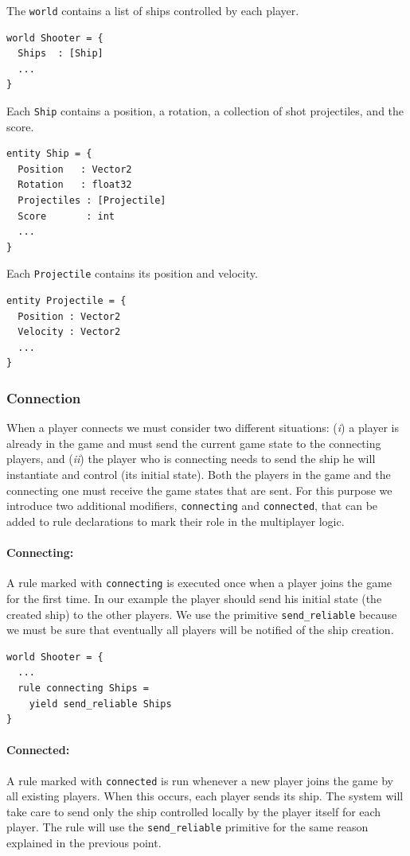 The \texttt{world} contains a list of ships controlled by each player.
\begin{lstlisting}
world Shooter = {
  Ships  : [Ship]
  ...
}
\end{lstlisting}

Each \texttt{Ship} contains a position, a rotation, a collection of shot projectiles, and the score.
\begin{lstlisting}
entity Ship = {
  Position   : Vector2
  Rotation   : float32
  Projectiles : [Projectile]
  Score		  : int
  ...
}

\end{lstlisting}

Each \texttt{Projectile} contains its position and velocity.

\begin{lstlisting}
entity Projectile = {
  Position : Vector2
  Velocity : Vector2
  ...
}
\end{lstlisting}

\subsubsection{Connection}
When a player connects we must consider two different situations: (\textit{i}) a player is already in the game and must send the current game state to the connecting players, and (\textit{ii}) the player who is connecting needs to send the ship he will instantiate and control (its initial state). Both the players in the game and the connecting one must receive the game states that are sent. For this purpose we introduce two additional modifiers, \texttt{connecting} and \texttt{connected}, that can be added to rule declarations to mark their role in the multiplayer logic.

\paragraph{Connecting:} A rule marked with \texttt{connecting} is executed once when a player joins the game for the first time. In our example the player should send his initial state (the created ship) to the other players. We use the primitive \texttt{send\_reliable} because we must be sure that eventually all players will be notified of the ship creation.
	\begin{lstlisting}
world Shooter = {
  ...
  rule connecting Ships =
    yield send_reliable Ships
}
	\end{lstlisting}
	
\paragraph{Connected:} A rule marked with \texttt{connected} is run whenever a new player joins the game by all existing players. When this occurs, each player sends its ship. The system will take care to send only the ship controlled locally by the player itself for each player. The rule will use the \texttt{send\_reliable} primitive for the same reason explained in the previous point.

